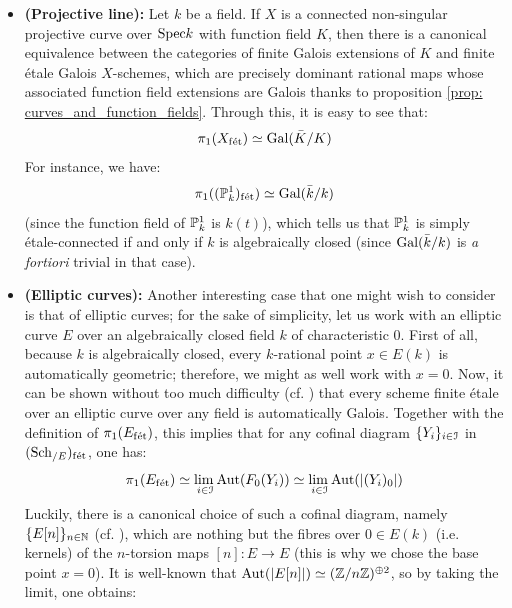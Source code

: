                 \begin{example} \label{example: etale_fundamental_group_of_a_curve}
                    \noindent
                    \begin{itemize}
                        \item \textbf{(Projective line):} Let $k$ be a field. If $X$ is a connected non-singular projective curve over $\Spec k$ with function field $K$, then there is a canonical equivalence between the categories of finite Galois extensions of $K$ and finite \'etale Galois $X$-schemes, which are precisely dominant rational maps whose associated function field extensions are Galois thanks to proposition \ref{prop: curves_and_function_fields}. Through this, it is easy to see that:
                            $$\pi_1(X_{\fet}) \cong \Gal(\bar{K}/K)$$
                        For instance, we have:
                            $$\pi_1((\P^1_k)_{\fet}) \cong \Gal(\bar{k}/k)$$
                        (since the function field of $\P^1_k$ is $k(t)$), which tells us that $\P^1_k$ is simply \'etale-connected if and only if $k$ is algebraically closed (since $\Gal(\bar{k}/k)$ is \textit{a fortiori} trivial in that case). 
                        \item \textbf{(Elliptic curves):} Another interesting case that one might wish to consider is that of elliptic curves; for the sake of simplicity, let us work with an elliptic curve $E$ over an algebraically closed field $k$ of characteristic $0$. First of all, because $k$ is algebraically closed, every $k$-rational point $x \in E(k)$ is automatically geometric; therefore, we might as well work with $x = 0$. Now, it can be shown without too much difficulty (cf. \cite[Proposition 5.11]{kundu_etale_fundamental_group_of_elliptic_curves}) that every scheme finite \'etale over an elliptic curve over any field is automatically Galois. Together with the definition of $\pi_1(E_{\fet})$, this implies that for any cofinal diagram $\{Y_i\}_{i \in \calI}$ in $(\Sch_{/E})_{\fet}$, one has:
                            $$\pi_1(E_{\fet}) \cong \underset{i \in \calI}{\lim} \Aut(F_0(Y_i)) \cong \underset{i \in \calI}{\lim} \Aut(|(Y_i)_0|)$$
                        Luckily, there is a canonical choice of such a cofinal diagram, namely $\{E[n]\}_{n \in \N}$ (cf. \cite[Proposition 3.8]{kundu_etale_fundamental_group_of_elliptic_curves}), which are nothing but the fibres over $0 \in E(k)$ (i.e. kernels) of the $n$-torsion maps $[n]: E \to E$ (this is why we chose the base point $x = 0$). It is well-known that $\Aut(|E[n]|) \cong (\Z/n\Z)^{\oplus 2}$, so by taking the limit, one obtains:

\end{itemize}
\end{example}
